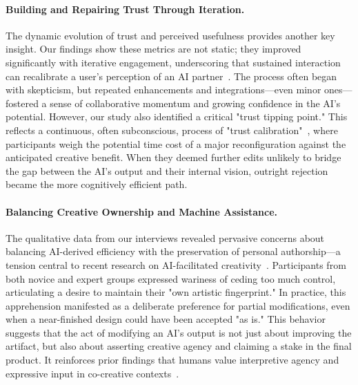 \documentclass[letterpaper]{article} %
\begin{document}
\paragraph{Building and Repairing Trust Through Iteration.}
The dynamic evolution of trust and perceived usefulness provides another key insight. Our findings show these metrics are not static; they improved significantly with iterative engagement, underscoring that sustained interaction can recalibrate a user's perception of an AI partner~\cite{buccinca2024optimizing,bansal2023workshop}. The process often began with skepticism, but repeated enhancements and integrations—even minor ones—fostered a sense of collaborative momentum and growing confidence in the AI's potential. However, our study also identified a critical "trust tipping point." This reflects a continuous, often subconscious, process of "trust calibration"~\cite{cao2022understanding}, where participants weigh the potential time cost of a major reconfiguration against the anticipated creative benefit. When they deemed further edits unlikely to bridge the gap between the AI’s output and their internal vision, outright rejection became the more cognitively efficient path.

\paragraph{Balancing Creative Ownership and Machine Assistance.}
The qualitative data from our interviews revealed pervasive concerns about balancing AI-derived efficiency with the preservation of personal authorship—a tension central to recent research on AI-facilitated creativity~\cite{xu2024artificial,formosa2024can}. Participants from both novice and expert groups expressed wariness of ceding too much control, articulating a desire to maintain their "own artistic fingerprint." In practice, this apprehension manifested as a deliberate preference for partial modifications, even when a near-finished design could have been accepted "as is." This behavior suggests that the act of modifying an AI's output is not just about improving the artifact, but also about asserting creative agency and claiming a stake in the final product. It reinforces prior findings that humans value interpretive agency and expressive input in co-creative contexts~\cite{chen2019artificial,liu2021understanding}.
\end{document}
